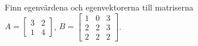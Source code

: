 Finn egenvärdena och egenvektorerna till matriserna\\
$A=\begin{bmatrix}3&2\\1&4\end{bmatrix}$, $B=\begin{bmatrix}1&0&3\\2&2&3\\2&2&2\end{bmatrix}$.